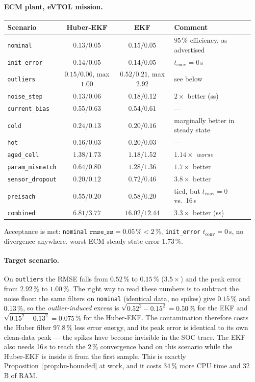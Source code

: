\paragraph{ECM plant, eVTOL mission.}
\begin{center}\small
\begin{tabular}{@{}lccl@{}}
\toprule
Scenario & Huber-EKF & EKF & Comment\\
\midrule
\texttt{nominal}        & $0.13/0.05$ & $0.15/0.05$ & $95\,\%$ efficiency, as advertised\\
\texttt{init\_error}    & $0.14/0.05$ & $0.14/0.05$ & $t_\mathrm{conv}=0$\,s\\
\texttt{outliers}       & $\mathbf{0.15/0.06}$, max $1.00$ & $0.52/0.21$, max $2.92$ & see below\\
\texttt{noise\_step}    & $\mathbf{0.13/0.06}$ & $0.18/0.12$ & $2\times$ better (ss)\\
\texttt{current\_bias}  & $0.55/0.63$ & $0.54/0.61$ & ---\\
\texttt{cold}           & $0.24/\mathbf{0.13}$ & $0.20/0.16$ & marginally better in steady state\\
\texttt{hot}            & $0.16/0.03$ & $0.20/0.03$ & ---\\
\texttt{aged\_cell}     & $1.38/1.73$ & $1.18/1.52$ & $1.14\times$ \emph{worse}\\
\texttt{param\_mismatch}& $\mathbf{0.64/0.80}$ & $1.28/1.36$ & $1.7\times$ better\\
\texttt{sensor\_dropout}& $\mathbf{0.20/0.12}$ & $0.72/0.46$ & $\mathbf{3.8\times}$ better\\
\texttt{preisach}       & $0.55/0.20$ & $0.58/0.20$ & tied, but $t_\mathrm{conv}=0$ vs.\ 16\,s\\
\texttt{combined}       & $\mathbf{6.81/3.77}$ & $16.02/12.44$ & $\mathbf{3.3\times}$ better (ss)\\
\bottomrule
\end{tabular}
\end{center}
Acceptance is met: \texttt{nominal} $\texttt{rmse\_ss}=0.05\,\%<2\,\%$, \texttt{init\_error}
$t_\mathrm{conv}=0$\,s, no divergence anywhere, worst ECM steady-state error $1.73\,\%$.

\paragraph{Target scenario.}  On \texttt{outliers} the RMSE falls from $0.52\,\%$ to $0.15\,\%$
($3.5\times$) and the peak error from $2.92\,\%$ to $1.00\,\%$.  The right way to read these
numbers is to subtract the noise floor: the same filters on \texttt{nominal} (identical data, no
spikes) give $0.15\,\%$ and $0.13\,\%$, so the \emph{outlier-induced} excess is
$\sqrt{0.52^2-0.15^2}=0.50\,\%$ for the EKF and $\sqrt{0.15^2-0.13^2}=0.075\,\%$ for the
Huber-EKF.  The contamination therefore costs the Huber filter $97.8\,\%$ less error energy, and
its peak error is identical to its own clean-data peak --- the spikes have become invisible in the
SOC trace.  The EKF also needs 16\,s to reach the $2\,\%$ convergence band on this scenario while
the Huber-EKF is inside it from the first sample.  This is exactly
Proposition~\ref{prop:hu-bounded} at work, and it costs $34\,\%$ more CPU time and 32\,B of RAM.

